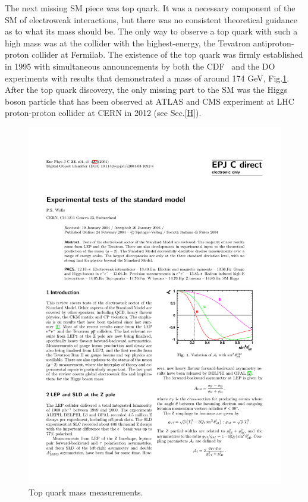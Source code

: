 The next missing SM piece was top quark. It was a necessary component of the SM of electroweak interactions, but there was no consistent theoretical guidance as to what its mass should be. The only way to observe a top quark with such a high mass was at the collider with the highest-energy, the Tevatron antiproton-proton collider at Fermilab. The existence of the top quark was firmly established in 1995 with simultaneous announcements by both the CDF~\cite{PhysRevLett.73.225} and the DO~\cite{D0:1995jca} experiments with results that demonstrated a mass of around 174 GeV, Fig.\ref{Wells2004_Article_ExperimentalTestsOfTheStandard}.
After the top quark discovery, the only missing part to the SM was the Higgs boson particle  that has been observed at ATLAS and CMS experiment at LHC proton-proton collider at CERN in 2012 (see Sec.\ref{H}).  
\begin{figure}
\centering
\includegraphics[scale= 1]{../Cap1/Wells2004_Article_ExperimentalTestsOfTheStandard}
\caption{Top quark mass measurements.}
\label{Wells2004_Article_ExperimentalTestsOfTheStandard}
\end{figure}





